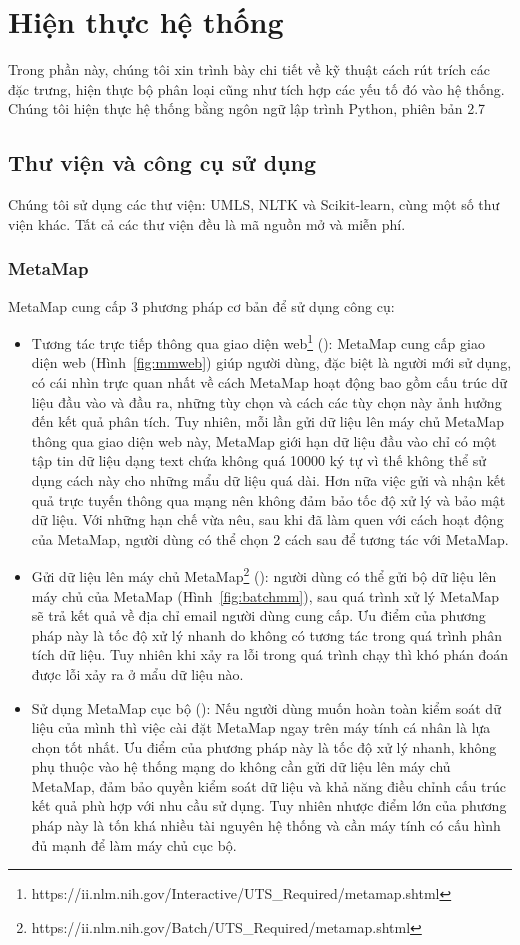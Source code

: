 \section{Hiện thực hệ thống} \label{sec:hienthuchethong}
Trong phần này, chúng tôi xin trình bày chi tiết về kỹ thuật cách rút trích các đặc trưng, hiện thực bộ phân loại cũng như tích hợp các yếu tố đó vào hệ thống. 
Chúng tôi hiện thực hệ thống bằng ngôn ngữ lập trình Python, phiên bản 2.7

\subsection{Thư viện và công cụ sử dụng}
Chúng tôi sử dụng các thư viện: UMLS, NLTK và Scikit-learn, cùng một số thư viện khác. Tất cả các thư viện đều là mã nguồn mở và miễn phí.
\subsubsection*{MetaMap}
MetaMap cung cấp 3 phương pháp cơ bản để sử dụng công cụ:
\begin{itemize}
\item Tương tác trực tiếp thông qua giao diện web\footnote{https://ii.nlm.nih.gov/Interactive/UTS\_Required/metamap.shtml} (): MetaMap cung cấp giao diện web (Hình~\ref{fig:mmweb}) giúp người dùng, đặc biệt là người mới sử dụng, có cái nhìn trực quan nhất về cách MetaMap hoạt động bao gồm cấu trúc dữ liệu đầu vào và đầu ra, những tùy chọn và cách các tùy chọn này ảnh hưởng đến kết quả phân tích. Tuy nhiên, mỗi lần gửi dữ liệu lên máy chủ MetaMap thông qua giao diện web này, MetaMap giới hạn dữ liệu đầu vào chỉ có một tập tin dữ liệu dạng text chứa không quá 10000 ký tự vì thế không thể sử dụng cách này cho những mẩu dữ liệu quá dài. Hơn nữa việc gửi và nhận kết quả trực tuyến thông qua mạng nên không đảm bảo tốc độ xử lý và bảo mật dữ liệu. Với những hạn chế vừa nêu, sau khi đã làm quen với cách hoạt động của MetaMap, người dùng có thể chọn 2 cách sau để tương tác với MetaMap.
\item Gửi dữ liệu lên máy chủ MetaMap\footnote{https://ii.nlm.nih.gov/Batch/UTS\_Required/metamap.shtml} (): người dùng có thể gửi bộ dữ liệu lên máy chủ của MetaMap (Hình~\ref{fig:batchmm}), sau quá trình xử lý MetaMap sẽ trả kết quả về địa chỉ email người dùng cung cấp. Ưu điểm của phương pháp này là tốc độ xử lý nhanh do không có tương tác trong quá trình phân tích dữ liệu. Tuy nhiên khi xảy ra lỗi trong quá trình chạy thì khó phán đoán được lỗi xảy ra ở mẩu dữ liệu nào. 
\item Sử dụng MetaMap cục bộ (): Nếu người dùng muốn hoàn toàn kiểm soát dữ liệu của mình thì việc cài đặt MetaMap ngay trên máy tính cá nhân là lựa chọn tốt nhất. Ưu điểm của phương pháp này là tốc độ xử lý nhanh, không phụ thuộc vào hệ thống mạng do không cần gửi dữ liệu lên máy chủ MetaMap, đảm bảo quyền kiểm soát dữ liệu và khả năng điều chỉnh cấu trúc kết quả phù hợp với nhu cầu sử dụng. Tuy nhiên nhược điểm lớn của phương pháp này là tốn khá nhiều tài nguyên hệ thống và cần máy tính có cấu hình đủ mạnh để làm máy chủ cục bộ.
\end{itemize}

